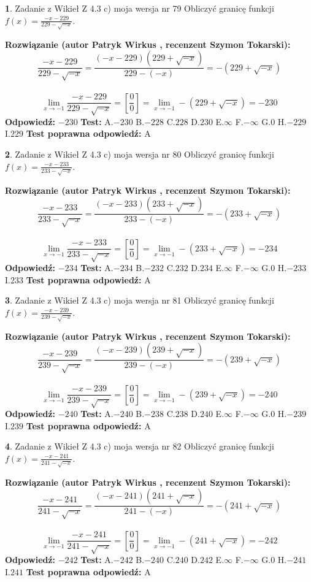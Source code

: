\documentclass[12pt, a4paper]{article}
\theoremstyle{definition} %
\newtheorem{zad}{}
\newcommand{\zadStart}[1]{\begin{zad}#1\newline}
\newcommand{\zadStop}{\end{zad}}
\newcommand{\rozwStart}[2]{\noindent \textbf{Rozwiązanie (autor #1 , recenzent #2): }\newline}
\newcommand{\rozwStop}{\newline}
\newcommand{\odpStart}{\noindent \textbf{Odpowiedź:}\newline}
\newcommand{\odpStop}{\newline}
\newcommand{\testStart}{\noindent \textbf{Test:}\newline}
\newcommand{\testStop}{\newline}
\newcommand{\kluczStart}{\noindent \textbf{Test poprawna odpowiedź:}\newline}
\newcommand{\kluczStop}{\newline}
\begin{document}
\zadStart{Zadanie z Wikieł Z 4.3 c) moja wersja nr 79}
Obliczyć granicę funkcji $f(x)=\frac{-x-229}{229-\sqrt{-x}}$.
\zadStop
\rozwStart{Patryk Wirkus}{Szymon Tokarski}
$$\frac{-x-229}{229-\sqrt{-x}}=\frac{(-x-229)(229+\sqrt{-x})}{229-(-x)}=-(229+\sqrt{-x})$$
\\
$$\lim\limits_{x\to-1}\frac{-x-229}{229-\sqrt{-x}}=[\frac{0}{0}]=\lim\limits_{x\to-1}-(229+\sqrt{-x}) =-230$$
\rozwStop
\odpStart
$-230$
\odpStop
\testStart
A.$-230$
B.$-228$
C.$228$
D.$230$
E.$\infty$
F.$-\infty$
G.$0$
H.$-229$
I.$229$
\testStop
\kluczStart
A
\kluczStop



\zadStart{Zadanie z Wikieł Z 4.3 c) moja wersja nr 80}
Obliczyć granicę funkcji $f(x)=\frac{-x-233}{233-\sqrt{-x}}$.
\zadStop
\rozwStart{Patryk Wirkus}{Szymon Tokarski}
$$\frac{-x-233}{233-\sqrt{-x}}=\frac{(-x-233)(233+\sqrt{-x})}{233-(-x)}=-(233+\sqrt{-x})$$
\\
$$\lim\limits_{x\to-1}\frac{-x-233}{233-\sqrt{-x}}=[\frac{0}{0}]=\lim\limits_{x\to-1}-(233+\sqrt{-x}) =-234$$
\rozwStop
\odpStart
$-234$
\odpStop
\testStart
A.$-234$
B.$-232$
C.$232$
D.$234$
E.$\infty$
F.$-\infty$
G.$0$
H.$-233$
I.$233$
\testStop
\kluczStart
A
\kluczStop



\zadStart{Zadanie z Wikieł Z 4.3 c) moja wersja nr 81}
Obliczyć granicę funkcji $f(x)=\frac{-x-239}{239-\sqrt{-x}}$.
\zadStop
\rozwStart{Patryk Wirkus}{Szymon Tokarski}
$$\frac{-x-239}{239-\sqrt{-x}}=\frac{(-x-239)(239+\sqrt{-x})}{239-(-x)}=-(239+\sqrt{-x})$$
\\
$$\lim\limits_{x\to-1}\frac{-x-239}{239-\sqrt{-x}}=[\frac{0}{0}]=\lim\limits_{x\to-1}-(239+\sqrt{-x}) =-240$$
\rozwStop
\odpStart
$-240$
\odpStop
\testStart
A.$-240$
B.$-238$
C.$238$
D.$240$
E.$\infty$
F.$-\infty$
G.$0$
H.$-239$
I.$239$
\testStop
\kluczStart
A
\kluczStop



\zadStart{Zadanie z Wikieł Z 4.3 c) moja wersja nr 82}
Obliczyć granicę funkcji $f(x)=\frac{-x-241}{241-\sqrt{-x}}$.
\zadStop
\rozwStart{Patryk Wirkus}{Szymon Tokarski}
$$\frac{-x-241}{241-\sqrt{-x}}=\frac{(-x-241)(241+\sqrt{-x})}{241-(-x)}=-(241+\sqrt{-x})$$
\\
$$\lim\limits_{x\to-1}\frac{-x-241}{241-\sqrt{-x}}=[\frac{0}{0}]=\lim\limits_{x\to-1}-(241+\sqrt{-x}) =-242$$
\rozwStop
\odpStart
$-242$
\odpStop
\testStart
A.$-242$
B.$-240$
C.$240$
D.$242$
E.$\infty$
F.$-\infty$
G.$0$
H.$-241$
I.$241$
\testStop
\kluczStart
A
\kluczStop
\end{document}
